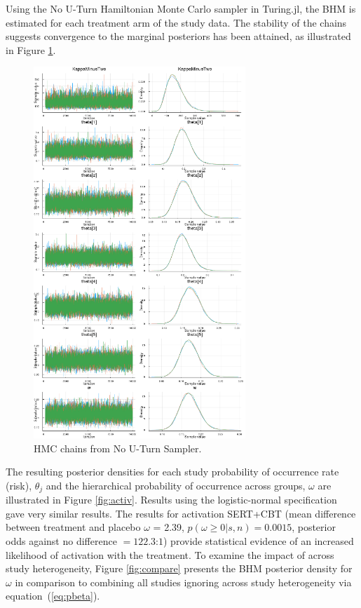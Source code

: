 \documentclass{juliacon}
\begin{document}
Using the No U-Turn Hamiltonian Monte Carlo sampler in Turing.jl, the BHM is estimated for each treatment arm of the study data. The stability of the chains suggests convergence to the marginal posteriors has been attained, as illustrated in Figure \ref{fig:chains}.
\begin{figure}[t]
	\centerline{\includegraphics[width=8cm]{mc_chains.png}}
	\caption{HMC chains from No U-Turn Sampler.}
	\label{fig:chains}
	\end{figure}

The resulting posterior densities for each study probability of occurrence rate (risk), $\theta_j$ and the hierarchical probability of occurrence across groups, $\omega$ are illustrated in Figure \ref{fig:activ}. Results using the logistic-normal specification gave very similar results. The results for activation SERT+CBT (mean difference between treatment and placebo $\omega$ = 2.39, $p(\omega \ge 0|s,n) = 0.0015$, posterior odds against no difference $= 122.3$:$1$) provide statistical evidence of an increased likelihood of activation with the treatment. To examine the impact of across study heterogeneity, Figure \ref{fig:compare} presents the BHM posterior density for $\omega$ in comparison to combining all studies ignoring across study heterogeneity via equation~(\ref{eq:pbeta}).
\end{document}

